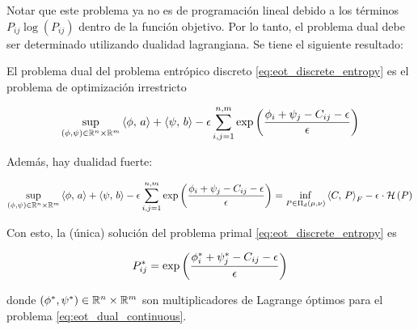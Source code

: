 Notar que este problema ya no es de programación lineal debido a los términos $P_{ij}\log(P_{ij})$ dentro de la función objetivo. Por lo tanto, el problema dual debe ser determinado utilizando dualidad lagrangiana. Se tiene el siguiente resultado:

\begin{prop}
	El problema dual del problema entrópico discreto \eqref{eq:eot_discrete_entropy} es el problema de optimización irrestricto

	\begin{equation}
		\label{eq:eot_dual_discrete}
		\sup_{(\phi,\psi)\in\mathbb{R}^n\times\mathbb{R}^m} \left\langle \phi,\,a\right\rangle + \left\langle \psi,\,b\right\rangle -\epsilon \sum_{i,j=1}^{n,m} \exp\left(\frac{\phi_i + \psi_j-C_{ij} - \epsilon}{\epsilon}\right)
	\end{equation}

	Además, hay dualidad fuerte:

	\begin{equation}
		\sup_{(\phi,\psi)\in\mathbb{R}^n\times\mathbb{R}^m} \left\langle \phi,\,a\right\rangle + \left\langle \psi,\,b\right\rangle -\epsilon \sum_{i,j=1}^{n,m} \exp\left(\frac{\phi_i + \psi_j-C_{ij} - \epsilon}{\epsilon}\right)
		=
		\inf_{P\in\Pi_d(\mu,\nu)} \left\langle C,\,P\right\rangle_F - \epsilon\cdot\mathcal{H}\left(P\right)
	\end{equation}

	Con esto, la (única) solución del problema primal \eqref{eq:eot_discrete_entropy} es

	\begin{equation}
		P_{ij}^* = \exp\left(\frac{\phi_i^* + \psi_j^* - C_{ij} - \epsilon}{\epsilon}\right)
	\end{equation}

	donde $(\phi^*,\psi^*)\in\mathbb{R}^n\times\mathbb{R}^m$ son multiplicadores de Lagrange óptimos para el problema \eqref{eq:eot_dual_continuous}.
\end{prop}

